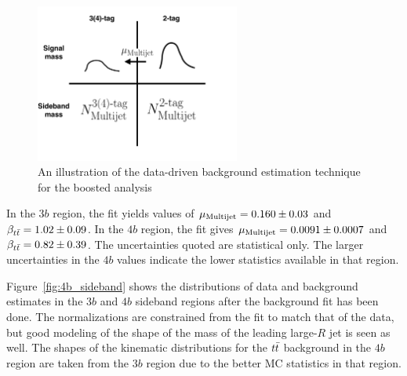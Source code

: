\begin{figure}[h!]
  \centering
  \captionsetup{justification=centering}

  \includegraphics[width=0.6\textwidth]{figures/4b_bkg_cartoon}
  \caption{An illustration of the data-driven background estimation technique for the boosted analysis}
  \label{fig:4b_bkg_cartoon}
\end{figure}
%
In the $3b$ region, the fit yields values of $\mu_{\rm Multijet} = 0.160 \pm 0.03$ and $\beta_{t\bar{t}} = 1.02 \pm 0.09$. In the $4b$ region, the fit gives $\mu_{\rm Multijet} = 0.0091 \pm 0.0007$ and $\beta_{t\bar{t}} = 0.82 \pm 0.39$. The uncertainties quoted are statistical only. The larger uncertainties in the $4b$ values indicate the lower statistics available in that region. 

Figure~\ref{fig:4b_sideband} shows the distributions of data and background estimates in the $3b$ and $4b$ sideband regions after the background fit has been done. The normalizations are constrained from the fit to match that of the data, but good modeling of the shape of the mass of the leading large-$R$ jet is seen as well. The shapes of the kinematic distributions for the $t\bar{t}$ background in the $4b$ region are taken from the $3b$ region due to the better MC statistics in that region. 

